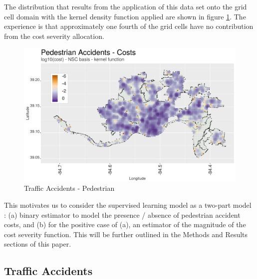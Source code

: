 \documentclass{llncs}
\begin{document}
The distribution that results from the application of this data set onto the grid cell domain with the kernel density function applied are shown in figure \ref{figure:PedestrianCosts}. The experience is that approximately one fourth of the grid cells have no contribution from the cost severity allocation.


\FloatBarrier
\begin{figure}
 	\includegraphics[width=\textwidth, height=\textheight, keepaspectratio]{trafficAccidentsPedestrianCosts.png}
 	\caption{Traffic Accidents - Pedestrian}
	\label{figure:PedestrianCosts}
\end{figure}
\FloatBarrier

This motivates us to consider the supervised learning model as a two-part model : (a) binary estimator to model the presence / absence of pedestrian accident costs, and (b) for the positive case of (a), an estimator of the magnitude of the cost severity function. This will be further outlined in the Methods and Results sections of this paper.


\subsection{Traffic Accidents}
\end{document}
